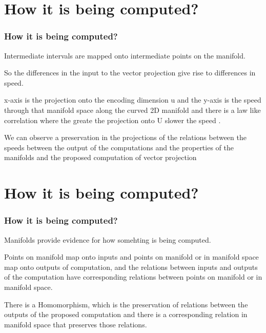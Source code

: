\documentclass{beamer}
\begin{document}

\section{How it is being computed?}
\begin{frame}
\frametitle{\textbf{How it is being computed?} }
Intermediate intervals are mapped onto intermediate points on the manifold.


So the differences in the input to the vector projection give rise to differences in speed.


x-axis is the projection onto the encoding dimension u and the y-axis is the speed through that manifold space along the curved 2D manifold and there is a law like correlation where the greate the projection onto U slower the speed .

We can observe a preservation in the projections of the relations between the speeds between the output of the computations and the properties of the manifolds and the proposed computation of vector projection

\end{frame}


\section{How it is being computed?}
\begin{frame}
\frametitle{\textbf{How it is being computed?} }
Manifolds provide evidence for how somehting is being computed.

Points on manifold map onto inputs and points on manifold or in manifold space map onto outputs of computation, and the relations between inputs and outputs of the computation have corresponding relations between points on manifold or in manifold space.

There is a Homomorphism, which is the preservation of relations between the outputs of the proposed computation and there is a corresponding relation in manifold space that preserves those relations.

\end{frame}
\end{document}
